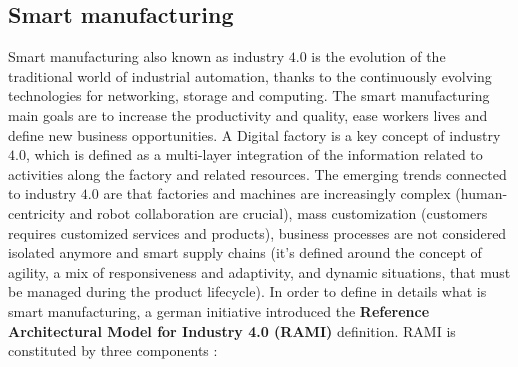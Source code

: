 \documentclass[11pt]{article}
\begin{document}
\subsection{Smart manufacturing}
Smart manufacturing also known as industry $4.0$ is the evolution of the traditional world of industrial automation, thanks to the continuously evolving technologies for networking, storage and computing. The smart manufacturing main goals are to increase the productivity and quality, ease workers lives and define new business opportunities. A Digital factory is a key concept of industry $4.0$, which is defined as a multi-layer integration of the information related to activities along the factory and related resources. The emerging trends connected to industry $4.0$ are that factories and machines are increasingly complex (human-centricity and robot collaboration are crucial), mass customization (customers requires customized services and products), business processes are not considered isolated anymore and smart supply chains (it's defined around the concept of agility, a mix of responsiveness and adaptivity, and dynamic situations, that must be managed during the product lifecycle).  In order to define in details what is smart manufacturing, a german initiative introduced the \textbf{Reference Architectural Model for Industry 4.0 (RAMI)} definition. RAMI is constituted by three components :
\end{document}
